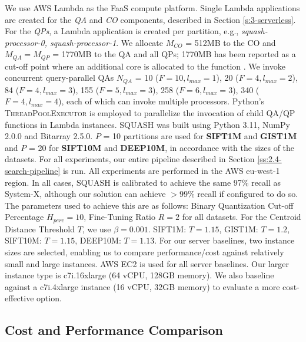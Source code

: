 We use AWS Lambda as the FaaS compute platform. Single Lambda applications are created for the \textit{QA} and \textit{CO} components, described in Section \ref{s:3-serverless}. 
For the \textit{QPs}, a Lambda application is created per partition, e.g., \textit{squash-processor-0, squash-processor-1}.  
We allocate $M_{CO}$ = 512MB to the CO and $M_{QA} = M_{QP} $ = 1770MB to the QA and all QPs; 1770MB has been reported as a cut-off point where an additional core is allocated to the function \cite{AWS-Lambda-1770MB, FN-AWS-Lambda-Memory-Compute}. 
We invoke concurrent query-parallel QAs $N_{QA}$ = 10 ($F=10, l_{max}=1$), 20 ($F=4, l_{max}=2$), 84 ($F=4, l_{max}=3$), 155 ($F=5, l_{max}=3$), 258 ($F=6, l_{max}=3$), 340 ($F=4, l_{max}=4$), each of which can invoke multiple processors. 
Python's \textsc{ThreadPoolExecutor} is employed to parallelize the invocation of child QA/QP functions in Lambda instances. 
SQUASH was built using Python 3.11, NumPy 2.0.0 and Bitarray 2.5.0. $P$ = 10 partitions are used for \textbf{SIFT1M} and \textbf{GIST1M} and $P$ = 20 for \textbf{SIFT10M} and \textbf{DEEP10M}, in accordance with the sizes of the datasets. 
For all experiments, our entire pipeline described in Section \ref{ss:2.4-search-pipeline} is run. 
All experiments are performed in the AWS eu-west-1 region. In all cases, SQUASH is calibrated to achieve the same 97\% recall as System-X, although our solution can achieve $>99\%$ recall if configured to do so.
The parameters used to achieve this are as follows: Binary Quantization Cut-off Percentage $H_{perc}=10$, Fine-Tuning Ratio $R=2$ for all datasets. 
For the Centroid Distance Threshold $T$, we use $\beta = 0.001$. SIFT1M: $T=1.15$, GIST1M: $T=1.2$, SIFT10M: $T=1.15$, DEEP10M: $T=1.13$.
For our server baselines, two instance sizes are selected, enabling us to compare performance/cost against relatively small and large instances. 
AWS EC2 is used for all server baselines. 
Our larger instance type is c7i.16xlarge (64 vCPU, 128GB memory). 
We also baseline against a c7i.4xlarge instance (16 vCPU, 32GB memory) to evaluate a more cost-effective option. 




\subsection{Cost and Performance Comparison}

